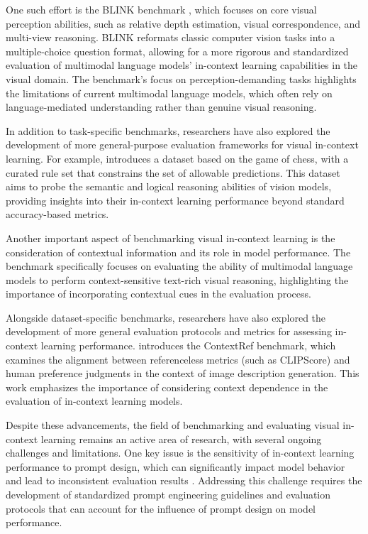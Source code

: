 \documentclass[11pt]{article}
\begin{document}
One such effort is the BLINK benchmark \cite{ref248}, which focuses on core visual perception abilities, such as relative depth estimation, visual correspondence, and multi-view reasoning. BLINK reformats classic computer vision tasks into a multiple-choice question format, allowing for a more rigorous and standardized evaluation of multimodal language models' in-context learning capabilities in the visual domain. The benchmark's focus on perception-demanding tasks highlights the limitations of current multimodal language models, which often rely on language-mediated understanding rather than genuine visual reasoning.

In addition to task-specific benchmarks, researchers have also explored the development of more general-purpose evaluation frameworks for visual in-context learning. For example, \cite{ref249} introduces a dataset based on the game of chess, with a curated rule set that constrains the set of allowable predictions. This dataset aims to probe the semantic and logical reasoning abilities of vision models, providing insights into their in-context learning performance beyond standard accuracy-based metrics.

Another important aspect of benchmarking visual in-context learning is the consideration of contextual information and its role in model performance. The \cite{ref184} benchmark specifically focuses on evaluating the ability of multimodal language models to perform context-sensitive text-rich visual reasoning, highlighting the importance of incorporating contextual cues in the evaluation process.

Alongside dataset-specific benchmarks, researchers have also explored the development of more general evaluation protocols and metrics for assessing in-context learning performance. \cite{ref250} introduces the ContextRef benchmark, which examines the alignment between referenceless metrics (such as CLIPScore) and human preference judgments in the context of image description generation. This work emphasizes the importance of considering context dependence in the evaluation of in-context learning models.

Despite these advancements, the field of benchmarking and evaluating visual in-context learning remains an active area of research, with several ongoing challenges and limitations. One key issue is the sensitivity of in-context learning performance to prompt design, which can significantly impact model behavior and lead to inconsistent evaluation results \cite{ref251}. Addressing this challenge requires the development of standardized prompt engineering guidelines and evaluation protocols that can account for the influence of prompt design on model performance.
\end{document}
